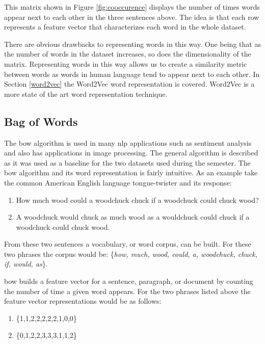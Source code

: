 \documentclass[12pt]{article}
\begin{document}
This matrix shown in Figure \ref{fig:cooccurence} displays the number of times words appear next to each other in the three sentences above. The idea is that each row represents a feature vector that characterizes each word in the whole dataset.

There are obvious drawbacks to representing words in this way. One being that as the number of words in the dataset increases, so does the dimensionality of the matrix. Representing words in this way allows us to create a similarity metric between words as words in human language tend to appear next to each other. In Section \ref{word2vec} the Word2Vec word representation is covered. Word2Vec is a more state of the art word representation technique.

\subsection {Bag of Words}

The \ac{bow} algorithm is used in many \ac{nlp} applications such as sentiment analysis and also has applications in image processing. The general algorithm is described as it was used as a baseline for the two datasets used during the semester. The \ac{bow} algorithm and its word representation is  fairly intuitive. As an example take the common American English language tongue-twister and its response:

\begin{enumerate}
	\item How much wood could a woodchuck chuck if a woodchuck could chuck wood?
	\item A woodchuck would chuck as much wood as a wouldchuck could chuck if a woodchuck could chuck wood.
\end{enumerate} 

From these two sentences a vocabulary, or word corpus, can be built. For these two phrases the corpus would be: \{\textit{how, much, wood, could, a, woodchuck, chuck, if, would, as}\}.

\ac{bow} builds a feature vector for a sentence, paragraph, or document by counting the number of time a given word appears. For the two phrases listed above the feature vector representations would be as follows:

\begin{enumerate}
	\item \{1,1,2,2,2,2,2,1,0,0\}
	\item \{0,1,2,2,3,3,3,1,1,2\} 
\end{enumerate} 
\end{document}

